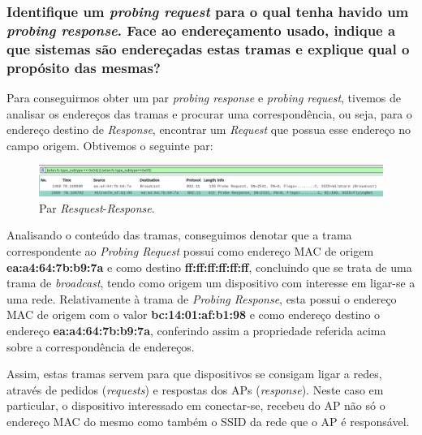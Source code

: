 \vspace{10pt}
\subsubsection{Identifique um \textit{probing request} para o qual tenha havido um \textit{probing response}. Face ao endereçamento usado, indique a que sistemas são endereçadas estas tramas e explique qual o propósito das mesmas?}

    \par Para conseguirmos obter um par \textit{probing response} e \textit{probing request}, tivemos de analisar os endereços das tramas e procurar uma correspondência, ou seja, para o endereço destino de \textit{Response}, encontrar um \textit{Request} que possua esse endereço no campo origem. Obtivemos o seguinte par:
    
    \begin{figure}[H]
    \centering
    \includegraphics[width=\linewidth]{Prints/Questao5/questao5-PAR.png}
    \caption{Par \textit{Resquest}-\textit{Response}.} \label{questao5-PARreqResp}
    \end{figure}
    
    \par Analisando o conteúdo das tramas, conseguimos denotar que a trama correspondente ao \textit{Probing Request} possui como endereço MAC de origem \textbf{ea:a4:64:7b:b9:7a} e como destino \textbf{ff:ff:ff:ff:ff:ff}, concluindo que se trata de uma trama de \textit{broadcast}, tendo como origem um dispositivo com interesse em ligar-se a uma rede. Relativamente à trama de \textit{Probing Response}, esta possui o endereço MAC de origem com o valor \textbf{bc:14:01:af:b1:98} e como endereço destino o endereço \textbf{ea:a4:64:7b:b9:7a}, conferindo assim a propriedade referida acima sobre a correspondência de endereços.
    
    \par Assim, estas tramas servem para que dispositivos se consigam ligar a redes, através de pedidos (\textit{requests}) e respostas dos APs (\textit{response}). Neste caso em particular, o dispositivo interessado em conectar-se, recebeu do AP não só o endereço MAC do mesmo como também o SSID da rede que o AP é responsável.